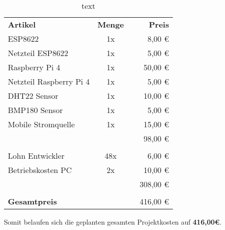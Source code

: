 \begin{table} [h]
	\centering
	\caption{text}
	\begin{tabularx}{\textwidth}{l c X r}
		\textbf{Artikel} & \textbf{Menge} & & \textbf{Preis} \\
		ESP8622 & 1x & & 8,00 € \\
		Netzteil ESP8622 & 1x & & 5,00 € \\
		Raspberry Pi 4 & 1x & & 50,00 € \\
		Netzteil Raspberry Pi 4 & 1x & & 5,00 € \\
		DHT22 Sensor & 1x & & 10,00 € \\
		BMP180 Sensor & 1x & & 5,00 € \\
		Mobile Stromquelle & 1x & & 15,00 € \\\cline{3-4}
		& & & 98,00 €\\
		& & & \\
		\hline
		Lohn Entwickler & 48x & & 6,00 € \\
		Betriebskosten PC & 2x & & 10,00 € \\\cline{3-4}
		& & & 308,00 € \\
		& & & \\
		\hline
		\textbf{Gesamtpreis} & & & 416,00 € \\\cline{3-4}
		\hline
		\hline
	\end{tabularx}
\end{table}

Somit belaufen sich die geplanten gesamten Projektkosten auf \textbf{416,00\euro{}}.